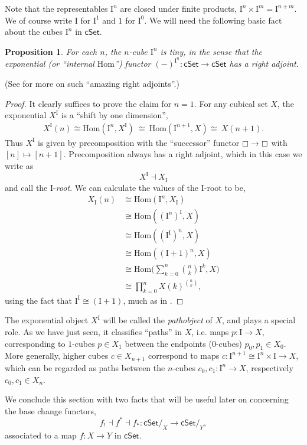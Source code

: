 \documentclass[12pt]{article}
\newcommand{\C}{\ensuremath{\boxempty}}
\newcommand{\cSet}{\ensuremath{\mathsf{cSet}}}
\renewcommand{\hom}{\ensuremath{\mathrm{Hom}}}
\renewcommand{\to}{\ensuremath{\rightarrow}}
\newcommand{\too}{\ensuremath{\longrightarrow}}
\newcommand{\I}{\ensuremath{\mathrm{I}}}
\newtheorem{proposition}[theorem]{Proposition}
\theoremstyle{remark}
\theoremstyle{definition}
\begin{document}
Note that the representables $\I^n$ are closed under finite products, $\I^n \times \I^m = \I^{n+m}$. We of course write $\I$ for $\I^1$ and $1$ for $\I^0$.  We will need the following basic fact about the cubes $\I^n$ in $\cSet$.

\begin{proposition}\label{prop:Itiny}
For each $n$, the $n$-cube $\I^n$ is \emph{tiny}, in the sense that the exponential (or ``internal $\hom$'') functor $(-)^{\I^n} : \cSet\too\cSet$ has a right adjoint.
\end{proposition}
\noindent (See \cite{Lawvere} for more on such ``amazing right adjoints''.)

\begin{proof}
It clearly suffices to prove the claim for $n=1$.   For any cubical set $X$, the exponential $X^\I$ is a ``shift by one dimension'', 
\[
\begin{split}
X^\I(n) \cong \hom(\I^n, X^\I)\ \cong\  \hom(\I^{n+1}, X)\cong\ X(n+1).
\end{split}
\]
Thus $X^\I$ is given by precomposition with the ``successor'' functor $\C\to\C$ with $[n] \mapsto [n+1]$. Precomposition always has a right adjoint, which in this case we write as $$X^\I\dashv X_\I $$ and call the $\I$-\emph{root}.  We can calculate the values of the $\I$-root to be,
\begin{align*}
X_\I(n) &\cong \hom(\I^n, X_\I) \\
&\cong \hom((\I^n)^\I, X) \\
&\cong \hom((\I^\I)^n, X) \\
&\cong \hom((\I+1)^n, X) \\
&\cong\textstyle \hom\big(\sum_{k=0}^{n} \binom{n}{k}\I^{k}, X\big) \\
&\cong \textstyle \prod_{k=0}^{n} X(k)^{\binom{n}{k}} ,
\end{align*}
using the fact that $\I^\I \cong (\I+1)$, much as in \cite{Fiore}.
\end{proof}

The exponential object  $X^\I$ will be called the \emph{pathobject} of $X$, and plays a special role. As we have just seen, it classifies ``paths'' in $X$, i.e. maps $p:\I \to X$, corresponding to $1$-cubes $p\in X_1$ between the endpoints ($0$-cubes) $p_0, p_1\in X_0$. More generally, higher cubes $c\in X_{n+1}$ correspond to maps $c : \I^{n+1}\cong \I^n\times \I \to X$, which can be regarded as paths between the $n$-cubes $c_0, c_1 : \I^n \to X$, respectively $c_0, c_1 \in X_n$.  

We conclude this section with two facts that will be useful later on concerning the base change functors, 
\[
f_!\dashv f^* \dashv f_* : \cSet/_X \too \cSet/_Y,
\]
associated to a map $f : X\to Y$  in $\cSet$.
\end{document}
